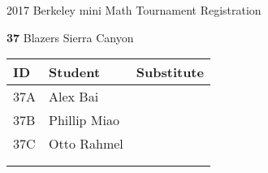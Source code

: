 \documentclass[12pt]{amsart}
\begin{document}
\newpage



\renewcommand{\TeamID}{37}
\renewcommand{\TeamName}{Blazers}
\renewcommand{\SchoolName}{Sierra Canyon}
\renewcommand{\IDA}{37A}
\renewcommand{\IDB}{37B}
\renewcommand{\IDC}{37C}
\renewcommand{\IDD}{}
\renewcommand{\IDE}{}
\renewcommand{\StudentA}{Alex Bai}
\renewcommand{\StudentB}{Phillip Miao}
\renewcommand{\StudentC}{Otto Rahmel}
\renewcommand{\StudentD}{}
\renewcommand{\StudentE}{}

\begin{center}
{\sc \Large 2017 Berkeley mini Math Tournament Registration}

\bigskip
\bigskip

{\bf \Large  \TeamID} \hfill {\large \TeamName} \hfill {\large \SchoolName}

\bigskip
\bigskip

\begin{tabular}{| p{} | p{} | p{} |}
\hline
\bf ID         & \bf Student             & \bf Substitute             \\ \hline
\IDA           & \StudentA               &                            \\ \hline
\IDB           & \StudentB               &                            \\ \hline
\IDC           & \StudentC               &                            \\ \hline
\IDD           & \StudentD               &                            \\ \hline
\IDE           & \StudentE               &                            \\ \hline
\end{tabular} 
\end{center}
\bigskip
\bigskip

\newpage



\renewcommand{\TeamID}{38}
\renewcommand{\TeamName}{Thornton Junior High School}
\renewcommand{\SchoolName}{Thornton Junior High School}
\renewcommand{\IDA}{38A}
\renewcommand{\IDB}{38B}
\renewcommand{\IDC}{38C}
\renewcommand{\IDD}{38D}
\renewcommand{\IDE}{}
\renewcommand{\StudentA}{Amogh Maddileti}
\renewcommand{\StudentB}{Anurag Murugesan}
\renewcommand{\StudentC}{Rahul Prakash}
\renewcommand{\StudentD}{Akshay Gona}
\renewcommand{\StudentE}{}
\end{document}
